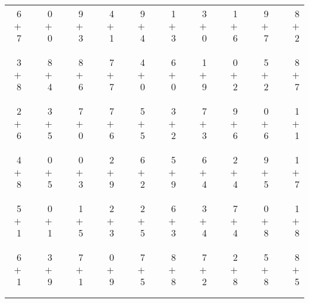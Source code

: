 \documentclass[12pt, letterpaper]{article}
\begin{document}
\begin{tabular}{rrrrrrrrrrrrrrrrrrr}
6 & & 0 & & 9 & & 4 & & 9 & & 1 & & 3 & & 1 & & 9 & & 8\\
$+$ 7 & & $+$ 0 & & $+$ 3 & & $+$ 1 & & $+$ 4 & & $+$ 3 & & $+$ 0 & & $+$ 6 & & $+$ 7 & & $+$ 2\\
\cline{1-1} \cline{3-3} \cline{5-5} \cline{7-7} \cline{9-9} \cline{11-11} \cline{13-13} \cline{15-15} \cline{17-17} \cline{19-19} \\ \\
3 & & 8 & & 8 & & 7 & & 4 & & 6 & & 1 & & 0 & & 5 & & 8\\
$+$ 8 & & $+$ 4 & & $+$ 6 & & $+$ 7 & & $+$ 0 & & $+$ 0 & & $+$ 9 & & $+$ 2 & & $+$ 2 & & $+$ 7\\
\cline{1-1} \cline{3-3} \cline{5-5} \cline{7-7} \cline{9-9} \cline{11-11} \cline{13-13} \cline{15-15} \cline{17-17} \cline{19-19} \\ \\
2 & & 3 & & 7 & & 7 & & 5 & & 3 & & 7 & & 9 & & 0 & & 1\\
$+$ 6 & & $+$ 5 & & $+$ 0 & & $+$ 6 & & $+$ 5 & & $+$ 2 & & $+$ 3 & & $+$ 6 & & $+$ 6 & & $+$ 1\\
\cline{1-1} \cline{3-3} \cline{5-5} \cline{7-7} \cline{9-9} \cline{11-11} \cline{13-13} \cline{15-15} \cline{17-17} \cline{19-19} \\ \\
4 & & 0 & & 0 & & 2 & & 6 & & 5 & & 6 & & 2 & & 9 & & 1\\
$+$ 8 & & $+$ 5 & & $+$ 3 & & $+$ 9 & & $+$ 2 & & $+$ 9 & & $+$ 4 & & $+$ 4 & & $+$ 5 & & $+$ 7\\
\cline{1-1} \cline{3-3} \cline{5-5} \cline{7-7} \cline{9-9} \cline{11-11} \cline{13-13} \cline{15-15} \cline{17-17} \cline{19-19} \\ \\
5 & & 0 & & 1 & & 2 & & 2 & & 6 & & 3 & & 7 & & 0 & & 1\\
$+$ 1 & & $+$ 1 & & $+$ 5 & & $+$ 3 & & $+$ 5 & & $+$ 3 & & $+$ 4 & & $+$ 4 & & $+$ 8 & & $+$ 8\\
\cline{1-1} \cline{3-3} \cline{5-5} \cline{7-7} \cline{9-9} \cline{11-11} \cline{13-13} \cline{15-15} \cline{17-17} \cline{19-19} \\ \\
6 & & 3 & & 7 & & 0 & & 7 & & 8 & & 7 & & 2 & & 5 & & 8\\
$+$ 1 & & $+$ 9 & & $+$ 1 & & $+$ 9 & & $+$ 5 & & $+$ 8 & & $+$ 2 & & $+$ 8 & & $+$ 8 & & $+$ 5\\
\cline{1-1} \cline{3-3} \cline{5-5} \cline{7-7} \cline{9-9} \cline{11-11} \cline{13-13} \cline{15-15} \cline{17-17} \cline{19-19} \\ \\

\end{tabular}
\end{document}
